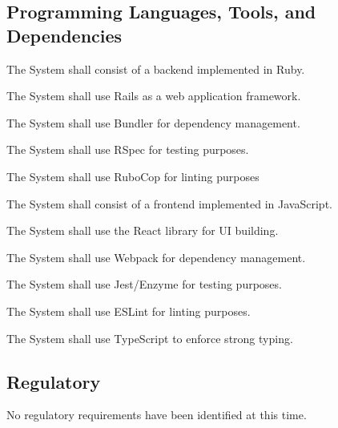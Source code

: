\documentclass[12pt]{report}
\begin{document}
	\subsection{Programming Languages, Tools, and Dependencies}
		\begin{reqlist}
			\item The System shall consist of a backend implemented in Ruby.
			\begin{reqlist}
				\item The System shall use Rails as a web application framework.
				\item The System shall use Bundler for dependency management.
				\item The System shall use RSpec for testing purposes.
				\item The System shall use RuboCop for linting purposes
			\end{reqlist}
			\item The System shall consist of a frontend implemented in JavaScript.
			\begin{reqlist}
				\item The System shall use the React library for UI building.
				\item The System shall use Webpack for dependency management.
				\item The System shall use Jest/Enzyme for testing purposes.
				\item The System shall use ESLint for linting purposes.
				\item The System shall use TypeScript to enforce strong typing.
			\end{reqlist}
		\end{reqlist}
	\subsection{Regulatory}
		\begin{reqlist}
			\item No regulatory requirements have been identified at this time.
		\end{reqlist}
\end{document}
